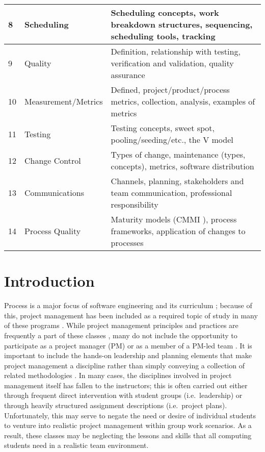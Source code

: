 \documentclass{sig-alternate}
\begin{document}
\begin{table*}[t]
\begin{tabular}{|p{0.25cm}|p{3.25cm}|p{13.0cm}|}
8&Scheduling&Scheduling concepts, work breakdown structures, sequencing, scheduling tools, tracking\\ \hline
9&Quality&Definition, relationship with testing, verification and validation, quality assurance\\ \hline
10&Measurement/Metrics&Defined, project/product/process metrics, collection, analysis, examples of metrics\\ \hline
11&Testing&Testing concepts, sweet spot, pooling/seeding/etc., the V model \cite{Feiler2012}\\ \hline
12&Change Control&Types of change, maintenance (types, concepts), metrics, software distribution\\ \hline
13&Communications&Channels, planning, stakeholders and team communication, professional responsibility\\ \hline
14&Process Quality&Maturity models (CMMI \cite{cmmi2014}), process frameworks, application of changes to processes\\ \hline\end{tabular}
\end{table*}

\section{Introduction}
Process is a major focus of software engineering and its curriculum \cite{Tadayon:2004:SEB:1050231.1050248,107024}; because of this, project management has
been included as a required topic of study in many of these programs \cite{Walker:2002:IRT:775742.775765}. While
project management principles and practices are frequently a part of these classes \cite{mit2012,Texas2012,wvu2014,rit2014}, many do not include the
opportunity to participate as a project manager (PM) or as a member of a PM-led team \cite{Kessler:2007:ITA:1227504.1227420}. It is important to include the hands-on leadership and planning
elements that make project management a discipline rather than simply conveying a collection of related
methodologies \cite{1612134}. In many cases, the disciplines involved in
project management itself has fallen to the instructors; this is often carried out either through frequent
direct intervention with student groups (i.e.\ leadership) or through heavily structured assignment descriptions (i.e.\ project plans).
Unfortunately, this may serve to negate the need or desire of individual students to venture into realistic
project management within group work scenarios. As a result, these classes may be neglecting the lessons and skills 
that all computing students need in a realistic team environment.
\end{document}
